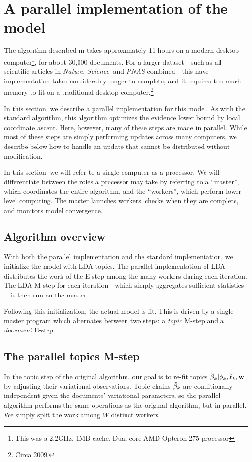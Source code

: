 \section{A parallel implementation of the model}
\label{section:influence_parallel_inference}

The algorithm described in  takes approximately 11
hours on a modern desktop computer\footnote{This was a 2.2GHz, 1MB
  cache, Dual core AMD Opteron 275 processor}, for about 30,000
documents.  For a larger dataset---such as all scientific articles in
\emph{Nature}, \emph{Science}, and \emph{PNAS} combined---this
nave implementation takes considerably longer to complete, and it
requires too much memory to fit on a traditional desktop
computer.\footnote{Circa 2009.}

In this section, we describe a parallel implementation for this model.
As with the standard algorithm, this algorithm optimizes the evidence
lower bound by local coordinate ascent.  Here, however, many of these
steps are made in parallel.  While most of these steps are simply
performing updates across many computers, we describe below how to
handle an update that cannot be distributed without modification.

In this section, we will refer to a single computer as a processor.
We will differentiate between the roles a processor may take by
referring to a ``master'', which coordinates the entire algorithm, and
the ``workers'', which perform lower-level computing.  The master
launches workers, checks when they are complete, and monitors
model convergence.

\subsection*{Algorithm overview}
With both the parallel implementation and the standard implementation,
we initialize the model with LDA topics.  The parallel implementation
of LDA distributes the work of the E step among the many workers
during each iteration.  The LDA M step for each iteration---which
simply aggregates sufficient statistics---is then run on the master.

Following this initialization, the actual model is fit.  This is
driven by a single master program which alternates between two steps:
a \emph{topic} M-step and a \emph{document} E-step.

\subsection*{The parallel topics M-step}
In the topic step of the original algorithm, our goal is to re-fit
topics $\tilde{\beta}_k | \phi_k, \tilde{\ell}_k, \textbf{w}$ by adjusting their variational
observations.  Topic chains $\tilde{\beta}_k$ are conditionally independent
given the documents' variational parameters, so the parallel algorithm
performs the same operations as the original algorithm, but in
parallel.  We simply split the work among $W$ distinct workers.

